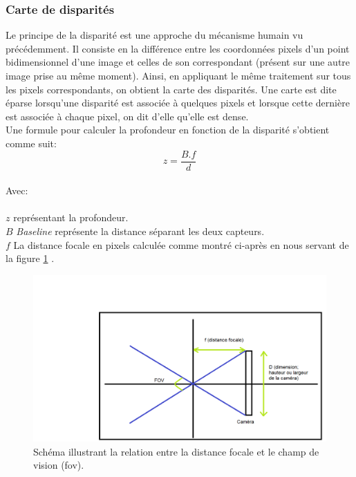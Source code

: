 \documentclass[a4paper, 12pt]{book}
\begin{document}
\subsubsection{Carte de disparités}
Le principe de la disparité est une approche du mécanisme humain vu précédemment. Il consiste en la différence entre les coordonnées pixels d'un point bidimensionnel d'une image et celles de son correspondant (présent sur une autre image prise au même moment). Ainsi, en appliquant le même traitement sur tous les pixels correspondants, on obtient la carte des disparités. Une carte est dite éparse lorsqu'une disparité est associée à quelques pixels et lorsque cette dernière est associée à chaque pixel, on dit d'elle qu'elle est dense.  \\ Une formule pour calculer la profondeur en fonction de la disparité s'obtient comme suit:
\begin{equation}
 z = \dfrac{B.f}{d}  
\end{equation} 
\\ Avec: \\ \\
$z$ représentant la profondeur. \\
$B$ \emph{Baseline} représente la distance séparant les deux capteurs. \\
$f$ La distance focale en pixels calculée comme montré ci-après en nous servant de la figure \ref{fig-focal} . \\
\begin{figure}[H]
  \hspace{-3cm}
 \includegraphics[scale=0.5]{images/focalLength.png} \hspace{2cm}
  \caption{Schéma illustrant la relation entre la distance focale et le champ de vision (fov).\label{fig-focal}}
\end{figure}
\end{document}
